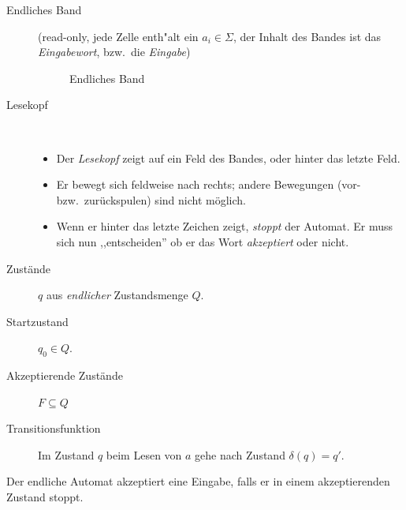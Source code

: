 \begin{description}
\item[Endliches Band] 
(read-only, jede Zelle enth"alt ein $a_i\in\Sigma$, der Inhalt des Bandes ist das \emph{Eingabewort}, bzw.\ die \emph{Eingabe})

\begin{figure}[H]\centering
        \caption{Endliches Band}
\end{figure}
\vspace{-1em}
\item[Lesekopf] ~\\
  \vspace{-\baselineskip}
  \begin{itemize}
        \item Der \emph{Lesekopf} zeigt auf ein Feld des Bandes, oder hinter das letzte Feld.
        \item Er bewegt sich feldweise nach rechts; andere Bewegungen (vor- bzw.\ zurückspulen) sind nicht möglich.
        \item Wenn er hinter das letzte Zeichen zeigt, \emph{stoppt} der Automat.
    Er muss sich nun ,,entscheiden'' ob er das Wort \emph{akzeptiert} oder nicht.
  \end{itemize}
\item[Zustände] $q$ aus \emph{endlicher} Zustandsmenge $Q$.
\item[Startzustand] $q_0 \in Q$.
\item[Akzeptierende Zustände] $F \subseteq Q$ 
\item[Transitionsfunktion] Im Zustand $q$ beim Lesen von $a$ gehe nach Zustand $\delta(q) = q'$.
\end{description}
Der endliche Automat akzeptiert eine Eingabe, falls er in einem akzeptierenden Zustand stoppt.

